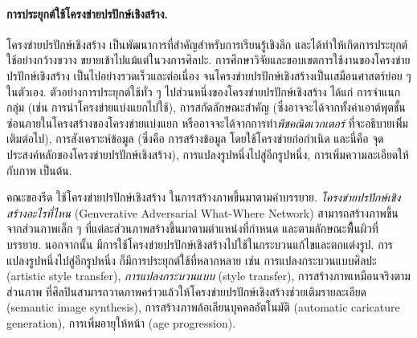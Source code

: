 \paragraph{การประยุกต์ใช้โครงข่ายปรปักษ์เชิงสร้าง.}
โครงข่ายปรปักษ์เชิงสร้าง เป็นพัฒนาการที่สำคัญสำหรับการเรียนรู้เชิงลึก 
และได้ทำให้เกิดการประยุกต์ใช้อย่างกว้างขวาง ขยายเข้าไปแม้แต่ในวงการศิลปะ.
การศึกษาวิจัยและขอบเขตการใช้งานของโครงข่ายปรปักษ์เชิงสร้าง เป็นไปอย่างรวดเร็วและต่อเนื่อง
จนโครงข่ายปรปักษ์เชิงสร้างเป็นเสมือนศาสตร์ย่อย ๆ ในตัวเอง.
ตัวอย่างการประยุกต์ใช้ทั่ว ๆ ไปส่วนหนึ่งของโครงข่ายปรปักษ์เชิงสร้าง ได้แก่
การจำแนกกลุ่ม (เช่น การนำโครงข่ายแบ่งแยกไปใช้),
การสกัดลักษณะสำคัญ (ซึ่งอาจจะได้จากทั้งค่าเอาต์พุตชั้นซ่อนภายในโครงสร้างของโครงข่ายแบ่งแยก หรืออาจจะได้จากการทำ\textit{พีชคณิตเวกเตอร์}
ที่จะอธิบายเพิิ่มเติมต่อไป),
การสังเคราะห์ข้อมูล (ซึ่งคือ การสร้างข้อมูล โดยใช้โครงข่ายก่อกำเนิด และนี่คือ จุดประสงค์หลักของโครงข่ายปรปักษ์เชิงสร้าง),
การแปลงรูปหนึ่งไปสู่อีกรูปหนึ่ง,
การเพิ่มความละเอียดให้กับภาพ เป็นต้น.

คณะของรีด\cite{ReedEtAl2016} ใช้โครงข่ายปรปักษ์เชิงสร้าง ในการสร้างภาพขึ้นมาตามคำบรรยาย.
\textit{โครงข่ายปรปักษ์เชิงสร้างอะไรที่ไหน} (Genverative Adversarial What-Where Network\cite{ReedEtAl2016a}) สามารถสร้างภาพขึ้นจากส่วนภาพเล็ก ๆ ที่แต่ละส่วนภาพสร้างขึ้นมาตามตำแหน่งที่กำหนด และตามลักษณะพืื้นผิวที่บรรยาย.
นอกจากนั้น มีการใช้โครงข่ายปรปักษ์เชิงสร้างไปใช้ในกระบวนแก้ไขและตกแต่งรูป\cite{BrockEtAl2017a, ZhuEtAl2016}.
การแปลงรูปหนึ่งไปสู่อีกรูปหนึ่ง\cite{IsolaEtAl2016} ก็มีการประยุกต์ใช้ที่หลากหลาย 
เช่น การแปลงกระบวนแบบศิลปะ (artistic style transfer\cite{LiWand2016}),
\textit{การแปลงกระบวนแบบ} (style transfer\cite{KarrasEtAl2019}),
การสร้างภาพเหมือนจริงตามส่วนภาพ ที่ศิลปินสามารถวาดภาพคร่าวแล้วให้โครงข่ายปรปักษ์เชิงสร้างช่วยเติมรายละเอียด (semantic image synthesis\cite{PartEtAl2019, GauGAN2019}),
การสร้างภาพล้อเลียนบุคคลอัตโนมัติ (automatic caricature generation\cite{ShiEtAl2019a}),
การเพิ่มอายุให้หน้า (age progression\cite{DebEtAl2020}).


